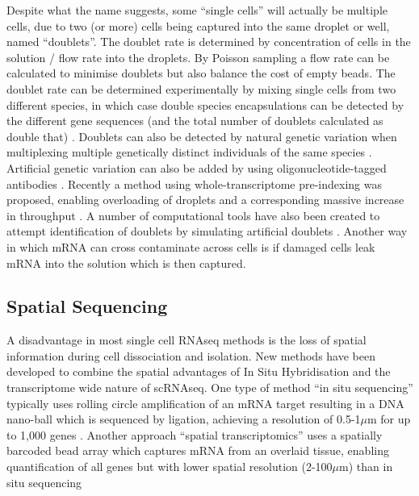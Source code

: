 Despite what the name suggests, some ``single cells'' will actually be multiple cells, due to two (or more) cells being captured into the same droplet or well, named ``doublets''.
The doublet rate is determined by concentration of cells in the solution / flow rate into the droplets.
By Poisson sampling a flow rate can be calculated to minimise doublets but also balance the cost of empty beads.
The doublet rate can be determined experimentally by mixing single cells from two different species, in which case double species encapsulations can be detected by the different gene sequences (and the total number of doublets calculated as double that) \parencite{Macosko2015Highly}.
 Doublets can also be detected by natural genetic variation when multiplexing multiple genetically distinct individuals of the same species \parencite{Kang2018Multiplexed}.
Artificial genetic variation can also be added by using oligonucleotide-tagged antibodies \parencite{Stoeckius2018Cell}.
Recently a method using whole-transcriptome pre-indexing was proposed, enabling overloading of droplets and a corresponding massive increase in throughput \parencite{Datlinger2019Ultrahigh}.
A number of computational tools have also been created to attempt identification of doublets by simulating artificial doublets \parencite{Wolock2019Scrublet, McGinnis2019DoubletFinder}.
Another way in which mRNA can cross contaminate across cells is if damaged cells leak mRNA into the solution which is then captured.



\subsection{Spatial Sequencing}
A disadvantage in most single cell RNAseq methods is the loss of spatial information during cell dissociation and isolation.
New methods have been developed to combine the spatial advantages of In Situ Hybridisation and the transcriptome wide nature of scRNAseq.
One type of method ``in situ sequencing'' typically uses rolling circle amplification of an mRNA target resulting in a DNA nano-ball which is sequenced by ligation, achieving a resolution of 0.5-1$\mu$m for up to 1,000 genes \parencite{Lee2014Highly, Wang2018Threedimensional, Qian2018spatial}.
Another approach ``spatial transcriptomics'' uses a spatially barcoded bead array which captures mRNA from an overlaid tissue, enabling quantification of all genes but with lower spatial resolution (2-100$\mu$m) than in situ sequencing \parencite{Stahl2016Visualization, Rodriques2019Slideseq, Vickovic2019Highdefinition}


